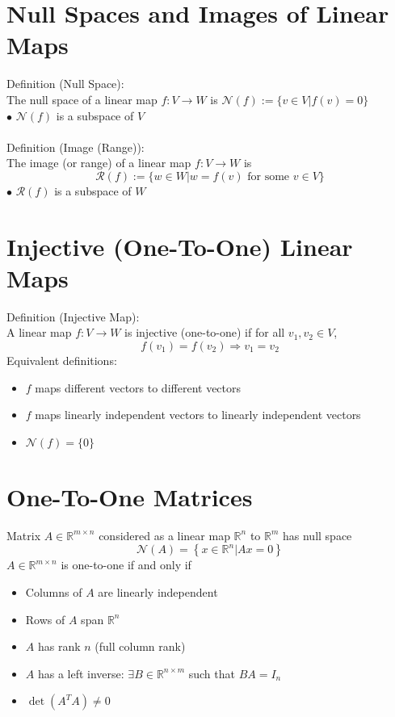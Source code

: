 \documentclass[10pt,a4paper,oneside]{article}
\begin{document}
\section{Null Spaces and Images of Linear Maps}
Definition (Null Space):\\
The null space of a linear map $f : V \rightarrow W$ is $\mathcal{N}(f) :=\{v \in V | f(v)=0\}$
\\$\bullet$ $\mathcal{N}(f)$ is a subspace of $V$
\\
\\Definition (Image (Range)):\\
The image (or range) of a linear map $f : V \rightarrow W$ is
\[
\mathcal{R}(f) :=\{w \in W | w=f(v) \text { for some } v \in V\}
\]
$\bullet$ $\mathcal{R}(f)$ is a subspace of $W$
\section{Injective (One-To-One) Linear Maps}
Definition (Injective Map):\\
A linear map $f : V \rightarrow W$ is injective (one-to-one) if for all $v_{1}, v_{2} \in V$,
\[
f\left(v_{1}\right)=f\left(v_{2}\right) \Rightarrow v_{1}=v_{2}
\]
Equivalent definitions:
\begin{itemize}
\item $f$ maps different vectors to different vectors
\item $f$ maps linearly independent vectors to linearly independent vectors
\item $\mathcal{N}(f)=\{0\}$
\end{itemize}
\section{One-To-One Matrices}
Matrix $A \in \mathbb{R}^{m \times n}$ considered as a linear map $\mathbb{R}^{n}$ to $\mathbb{R}^{m}$ has null space
\[
\mathcal{N}(A)=\left\{x \in \mathbb{R}^{n} | A x=0\right\}
\]
$A \in \mathbb{R}^{m \times n}$ is one-to-one if and only if
\begin{itemize}
\item Columns of $A$ are linearly independent
\item Rows of $A$ span $\mathbb{R}^n$
\item $A$ has rank $n$ (full column rank)
\item $A$ has a left inverse: $\exists B \in \mathbb{R}^{n \times m}$ such that $B A=I_{n}$
\item $\det(A^TA)\neq0$
\end{itemize}
\end{document}
